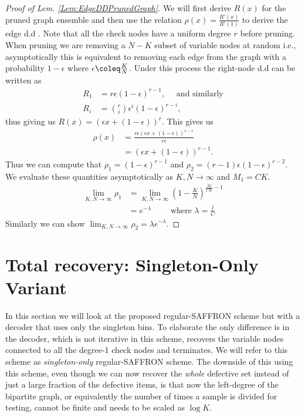 \documentclass[conference,,twocolumn]{IEEEtran}
\begin{document}
\begin{proof}[Proof of Lem. \ref{Lem:EdgeDDPrunedGraph}]
We will first derive $R(x)$ for the pruned graph ensemble and then use the relation\cite{richardson2008modern} $\rho(x)=\frac{R'(x)}{R'(1)}$ to derive the edge d.d . Note that all the check nodes have a uniform degree $r$ before pruning. When pruning we are removing a $N-K$ subset of variable nodes at random i.e., asymptotically this is equivalent to removing each edge from the graph with a probability $1-\epsilon$ where $\epsilon\coleq \frac{K}{N}$. Under this process the right-node d.d can be written as
\begin{align}
R_1&=r\epsilon(1-\epsilon)^{r-1},\quad \text{ and similarly}\label{Eqn:Deg1ChkDistribution}\\
R_i &=\binom{r}{i} \epsilon^{i}(1-\epsilon)^{r-i},\nonumber
\end{align}
thus giving us $R(x)=(\epsilon x+(1-\epsilon))^{r}$. This gives us 
\begin{align*}
\rho(x)&=\frac{r\epsilon(\epsilon x+(1-\epsilon))^{r-1}}{r\epsilon}\\
          &=(\epsilon x+(1-\epsilon))^{r-1}.
\end{align*}
Thus we can compute that $\rho_1=(1-\epsilon)^{r-1}$ and $\rho_2=(r-1)\epsilon(1-\epsilon)^{r-2}$. We evaluate these quantities asymptotically as $K,N\rightarrow \infty$ and $M_1=CK$.
\begin{align*}
\lim_{K,N\rightarrow \infty} \rho_1&=\lim_{K,N\rightarrow \infty} (1-\frac{K}{N})^{\frac{Nl}{CK}-1}\\
&=e^{-\lambda} \qquad \text{ where } \lambda=\frac{l}{C}
\end{align*}
Similarly we can show $\lim_{K,N\rightarrow \infty}\rho_2=\lambda e^{-\lambda}$.
\end{proof}


\section{Total recovery: Singleton-Only Variant}
In this section we will look at the proposed regular-SAFFRON scheme but with a decoder that uses only the singleton bins. To elaborate the only difference is in the decoder, which is not iterative in this scheme, recovers the variable nodes connected to all the degree-1 check nodes and terminates. We will refer to this scheme as \textit{singleton-only} regular-SAFFRON scheme. The downside of this using this scheme, even though we can now recover the \textit{whole} defective set instead of just a large fraction of the defective items, is that now the left-degree of the bipartite graph, or equivalently the number of times a sample is divided for testing, cannot be finite and needs to be scaled as $\log K$.
\end{document}
